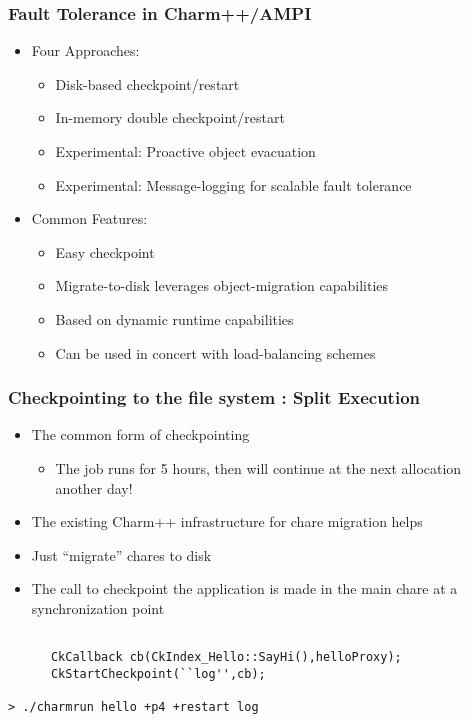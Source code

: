 \begin{frame}[fragile]

  \frametitle{Fault Tolerance in Charm++/AMPI}

  \begin{itemize}
    \item Four Approaches:

      \begin{itemize}
\item Disk-based checkpoint/restart
\item In-memory double checkpoint/restart
\item Experimental: Proactive object evacuation
\item Experimental: Message-logging for scalable fault tolerance
      \end{itemize}
    \item Common Features:
\begin{itemize}
\item Easy checkpoint 
\item Migrate-to-disk leverages object-migration capabilities
\item Based on dynamic runtime capabilities
\item Can be used in concert with load-balancing schemes
     \end{itemize}
  \end{itemize}
\end{frame}

\begin{frame}[fragile]
  \frametitle{Checkpointing to the file system : Split Execution}
\begin{itemize}
\item The common form of checkpointing
\begin{itemize}
\item The job runs for 5 hours, then will continue at the next
  allocation another day! 
\end{itemize}

\item The existing Charm++ infrastructure for chare migration helps
\item Just ``migrate'' chares to disk
\item The call to checkpoint the application is made in the main chare at a synchronization point
\end{itemize}

 \begin{lstlisting}[basicstyle=\footnotesize]

      CkCallback cb(CkIndex_Hello::SayHi(),helloProxy);
      CkStartCheckpoint(``log'',cb);

> ./charmrun hello +p4 +restart log

\end{lstlisting}

\end{frame}

